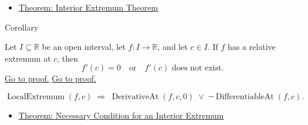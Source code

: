 \begin{remark*}[Dependencies]
\begin{itemize}
  \item \hyperref[thm:interior-extremum-theorem]{Theorem: Interior Extremum Theorem}
\end{itemize}
\end{remark*}


\begin{corollarybox}{Corollary}
\begin{corollary}
\label{cor:necessary-condition-extremum}
Let $I \subseteq \mathbb{R}$ be an open interval, let $f : I \to \mathbb{R}$, and let $c \in I$. If $f$ has a relative extremum at $c$, then
\[
f'(c) = 0 \quad \text{or} \quad f'(c) \text{ does not exist.}
\]
\hyperref[prf:relative-extremum-derivatives-equal-0-or-dont-exist]{Go to proof.}
\hyperref[prf:necessary-condition-extremum]{Go to proof.}
\end{corollary}
\end{corollarybox}

\begin{remark*}
\[
\operatorname{LocalExtremum}(f,c)
\;\Rightarrow\;
\operatorname{DerivativeAt}(f,c,0) \;\lor\; \lnot\operatorname{DifferentiableAt}(f,c).
\]
\end{remark*}

\begin{remark*}[Dependencies]
\begin{itemize}
  \item \hyperref[thm:necessary-condition-extremum]{Theorem: Necessary Condition for an Interior Extremum}
\end{itemize}
\end{remark*}
